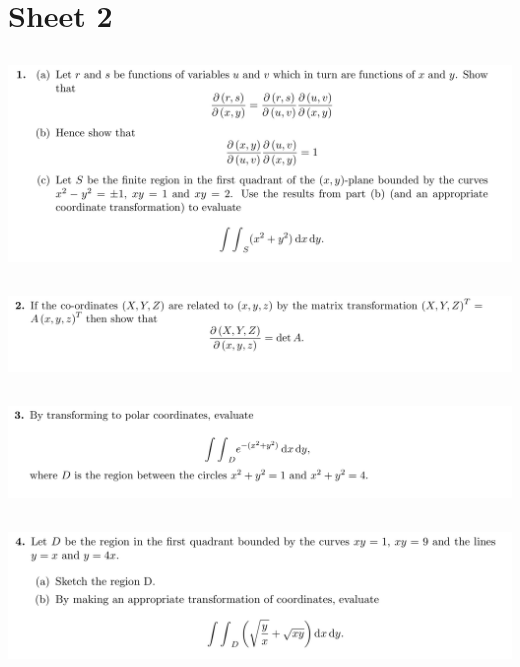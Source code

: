 \documentclass[12pt]{article}
\begin{document}
\newpage
\section{Sheet 2}

\subsection{}
\begin{mdframed}
\includegraphics[width=400pt]{img/oxford-prelims-M5-multivariable-calc-2-1.png}
\end{mdframed}

\subsection{}
\begin{mdframed}
\includegraphics[width=400pt]{img/oxford-prelims-M5-multivariable-calc-2-2.png}
\end{mdframed}

\subsection{}
\begin{mdframed}
\includegraphics[width=400pt]{img/oxford-prelims-M5-multivariable-calc-2-3.png}
\end{mdframed}

\subsection{}
\begin{mdframed}
\includegraphics[width=400pt]{img/oxford-prelims-M5-multivariable-calc-2-4.png}
\end{mdframed}
\end{document}
